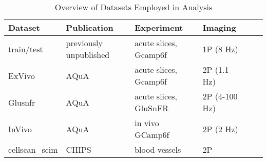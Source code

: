 
\begin{table}[ht]
    \centering
    \caption{Overview of Datasets Employed in Analysis}
    \label{tab:datasets}
    \begin{tabular}{|l|l|l|l|l|l|}
        \hline
        \textbf{Dataset} & \textbf{Publication} & \textbf{Experiment} & \textbf{Imaging} \\ \hline
        train/test & previously unpublished & acute slices, Gcamp6f & \ac{1P} (8 Hz) \\ \hline
        ExVivo & AQuA\citep{wang_event-based_2018} & acute slices, Gcamp6f & \ac{2P} (1.1 Hz) \\ \hline
        Glusnfr & AQuA\citep{wang_event-based_2018} & acute slices, GluSnFR & \ac{2P} (4-100 Hz) \\ \hline
        InVivo & AQuA\citep{wang_event-based_2018} & in vivo GCamp6f & \ac{2P} (2 Hz) \\ \hline
        cellscan\_scim & CHIPS\citep{barrett_chips_2018} & blood vessels & \ac{2P} \\ \hline
    \end{tabular}
\end{table}